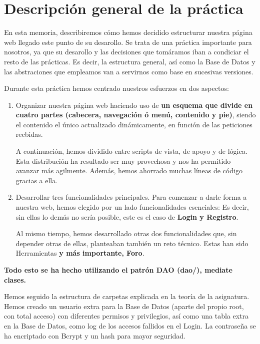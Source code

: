 \documentclass[12pt]{report}
\begin{document}
\section{Descripción general de la práctica}

En esta memoria, describiremos cómo hemos decidido estructurar nuestra página web llegado este punto de su desarollo.  Se trata de una práctica importante para nosotros, ya que su desarollo y las decisiones que tomáramos iban a condiciar el resto de las prácticas. Es decir, la estructura general, así como la Base de Datos y las abstraciones que empleamos van a servirnos como base en sucesivas versiones.

Durante esta práctica hemos centrado nuestros esfuerzos en dos aspectos:

\begin{enumerate}  
\item Organizar nuestra página web haciendo uso de \textbf{un esquema que divide en cuatro partes (cabecera, navegación ó menú, contenido y pie)}, siendo el contenido el único actualizado dinámicamente, en función de las peticiones recbidas. 

A continuación, hemos dividido entre scripts de vista, de apoyo y de lógica. Esta distribución ha resultado ser muy provechosa y nos ha permitido avanzar más agilmente. Además, hemos ahorrado muchas líneas de código gracias a ella.

\item Desarrollar tres funcionalidades principales. Para comenzar a darle forma a nuestra web, hemos elegido por un lado funcionalidades esenciales: Es decir, sin ellas lo demás no sería posible, este es el caso de \textbf{Login y Registro}. 

Al mismo tiempo, hemos desarrollado otras dos funcionalidades que, sin depender otras de ellas, planteaban también un reto técnico. Estas han sido Herramientas \textbf{y más importante, Foro}.

\end{enumerate}

\textbf{Todo esto se ha hecho utilizando el patrón DAO (dao/), mediate clases.}

Hemos seguido la estructura de carpetas explicada en la teoría de la asignatura. Hemos creado un usuario extra para la Base de Datos (aparte del propio root, con total acceso) con diferentes permisos y privilegios, así como una tabla extra en la Base de Datos, como log de los accesos fallidos en el Login. La contraseña se ha encriptado con Bcrypt y un hash para mayor seguridad. 
\newline
\end{document}
